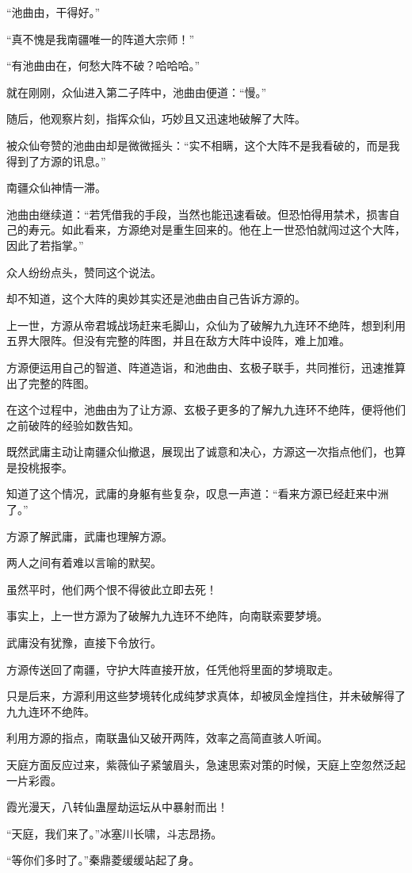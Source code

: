 \begin{this_body}
“池曲由，干得好。”

“真不愧是我南疆唯一的阵道大宗师！”

“有池曲由在，何愁大阵不破？哈哈哈。”

就在刚刚，众仙进入第二子阵中，池曲由便道：“慢。”

随后，他观察片刻，指挥众仙，巧妙且又迅速地破解了大阵。

被众仙夸赞的池曲由却是微微摇头：“实不相瞒，这个大阵不是我看破的，而是我得到了方源的讯息。”

南疆众仙神情一滞。

池曲由继续道：“若凭借我的手段，当然也能迅速看破。但恐怕得用禁术，损害自己的寿元。如此看来，方源绝对是重生回来的。他在上一世恐怕就闯过这个大阵，因此了若指掌。”

众人纷纷点头，赞同这个说法。

却不知道，这个大阵的奥妙其实还是池曲由自己告诉方源的。

上一世，方源从帝君城战场赶来毛脚山，众仙为了破解九九连环不绝阵，想到利用五界大限阵。但没有完整的阵图，并且在敌方大阵中设阵，难上加难。

方源便运用自己的智道、阵道造诣，和池曲由、玄极子联手，共同推衍，迅速推算出了完整的阵图。

在这个过程中，池曲由为了让方源、玄极子更多的了解九九连环不绝阵，便将他们之前破阵的经验如数告知。

既然武庸主动让南疆众仙撤退，展现出了诚意和决心，方源这一次指点他们，也算是投桃报李。

知道了这个情况，武庸的身躯有些复杂，叹息一声道：“看来方源已经赶来中洲了。”

方源了解武庸，武庸也理解方源。

两人之间有着难以言喻的默契。

虽然平时，他们两个恨不得彼此立即去死！

事实上，上一世方源为了破解九九连环不绝阵，向南联索要梦境。

武庸没有犹豫，直接下令放行。

方源传送回了南疆，守护大阵直接开放，任凭他将里面的梦境取走。

只是后来，方源利用这些梦境转化成纯梦求真体，却被凤金煌挡住，并未破解得了九九连环不绝阵。

利用方源的指点，南联蛊仙又破开两阵，效率之高简直骇人听闻。

天庭方面反应过来，紫薇仙子紧皱眉头，急速思索对策的时候，天庭上空忽然泛起一片彩霞。

霞光漫天，八转仙蛊屋劫运坛从中暴射而出！

“天庭，我们来了。”冰塞川长啸，斗志昂扬。

“等你们多时了。”秦鼎菱缓缓站起了身。

\end{this_body}


